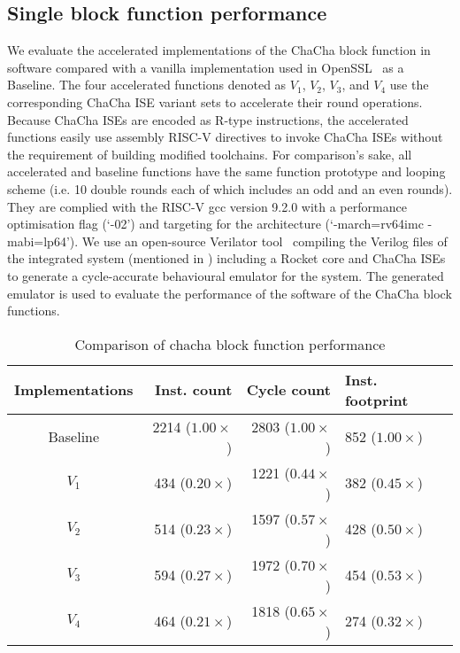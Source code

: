 
\subsection{Single block function performance}
\label{sec:eval:blk}
We evaluate the accelerated implementations of the ChaCha block function in software compared with a vanilla implementation used in OpenSSL~\cite{OpenSSL} as a Baseline. The four accelerated functions denoted as $V_1$, $V_2$, $V_3$, and $V_4$ use the corresponding ChaCha ISE variant sets to accelerate their round operations. 
Because ChaCha ISEs are encoded as R-type instructions, the accelerated functions easily use assembly RISC-V directives  to invoke ChaCha ISEs without the requirement of building modified toolchains.   
For comparison's sake, all accelerated and baseline functions have the same function prototype and looping scheme (i.e. 10 double rounds each of which includes an odd and an even rounds). 
They are complied with the RISC-V gcc version 9.2.0 with a performance optimisation flag (`-02') and targeting for the  architecture (`-march=rv64imc -mabi=lp64'). 
We use an open-source Verilator tool~\cite{Verilator} compiling the Verilog files of the integrated system (mentioned in ) including a Rocket core and ChaCha ISEs to generate a cycle-accurate behavioural emulator for the system. The generated emulator is used to evaluate the performance of the software of the ChaCha block functions.  

\begin{table}[b]
\caption{Comparison of chacha block function performance}
\label{tab:res:sw:perf1}
\begin{tabular}{crrl}
\toprule            
Implementations        & Inst. count   & Cycle count & Inst. footprint\\

\midrule
Baseline     & 2214 ($1.00\times$)  & 2803 ($1.00\times$)    &  852 ($1.00\times$)  \\
 $V_1$ &  434 ($0.20\times$)     & 1221 ($0.44\times$) &  382 ($0.45\times$) \\
 $V_2$ &  514 ($0.23\times$)     & 1597 ($0.57\times$) &  428 ($0.50\times$)\\
 $V_3$ &  594 ($0.27\times$)     & 1972 ($0.70\times$) &  454 ($0.53\times$)\\
 $V_4$ &  464 ($0.21\times$)     & 1818 ($0.65\times$) &  274 ($0.32\times$)\\

\bottomrule
\end{tabular}
\end{table}

